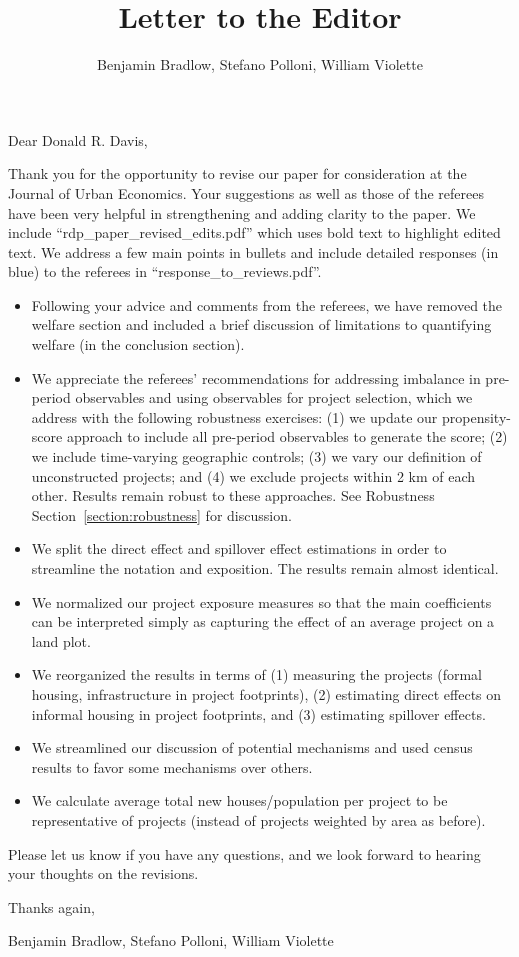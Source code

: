 \documentclass{article}
\title{Letter to the Editor}
\author{Benjamin Bradlow, Stefano Polloni, William Violette}
\newcounter{reviewer}
\newcounter{point}[reviewer]
\begin{document}
\maketitle



\noindent Dear Donald R. Davis,
\vspace{1em}

Thank you for the opportunity to revise our paper for consideration at the Journal of Urban Economics.  Your suggestions as well as those of the referees have been very helpful in strengthening and adding clarity to the paper.  We include ``rdp\_paper\_revised\_edits.pdf'' which uses bold text to highlight edited text.  We address a few main points in bullets and include detailed responses (in blue) to the referees in ``response\_to\_reviews.pdf''.  

\begin{itemize}
\item Following your advice and comments from the referees, we have removed the welfare section and included a brief discussion of limitations to quantifying welfare (in the conclusion section).
\item We appreciate the referees' recommendations for addressing imbalance in pre-period observables and using observables for project selection, which we address with the following robustness exercises: (1) we update our propensity-score approach to include all pre-period observables to generate the score; (2) we include time-varying geographic controls; (3) we vary our definition of unconstructed projects; and (4) we exclude projects within 2 km of each other.  Results remain robust to these approaches.  See Robustness Section~\ref{section:robustness} for discussion.
\item We split the direct effect and spillover effect estimations in order to streamline the notation and exposition.  The results remain almost identical.
\item We normalized our project exposure measures so that the main coefficients can be interpreted simply as capturing the effect of an average project on a land plot.
\item We reorganized the results in terms of (1) measuring the projects (formal housing, infrastructure in project footprints), (2) estimating direct effects on informal housing in project footprints, and (3) estimating spillover effects.
\item We streamlined our discussion of potential mechanisms and used census results to favor some mechanisms over others.
\item We calculate average total new houses/population per project to be representative of projects (instead of projects weighted by area as before).
\end{itemize}
Please let us know if you have any questions, and we look forward to hearing your thoughts on the revisions.
\vspace{.1em}

\noindent Thanks again,
\vspace{1em}

Benjamin Bradlow, Stefano Polloni, William Violette
\end{document}
